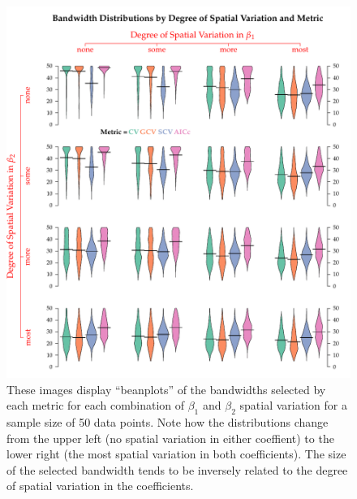 \documentclass{article}\usepackage{graphicx, color}
\begin{document}
\begin{figure}\label{fig:bandwidthsSS50bySpatVar}
\includegraphics{figure/bandwidthsSS50bySpatVar.pdf}
\caption{These images display ``beanplots'' of the bandwidths selected by each metric for each combination of $\beta _1$ and $\beta _2$ spatial variation for a sample size of 50 data points. Note how the distributions change from the upper left (no spatial variation in either coeffient) to the lower right (the most spatial variation in both coefficients). The size of the selected bandwidth tends to be inversely related to the degree of spatial variation in the coefficients.}
\end{figure}
\end{document}

